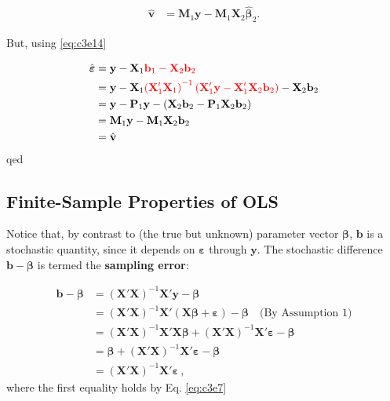 \documentclass[
]{book}
\begin{document}
\begin{align*}
\hat{\mathbf{v}} &= \mathbf{M}_1\mathbf{y}-\mathbf{M}_1\mathbf{X}_2\hat{\boldsymbol{\beta}}_2.
\end{align*}

But, using \eqref{eq:c3e14}

\begin{align*}
\hat{\boldsymbol{\varepsilon}}
&= \mathbf{y}-\mathbf{X}_1{\color{red}{\mathbf{b}_1}-\mathbf{X}_2\mathbf{b}_2} \\
&= \mathbf{y}-\mathbf{X}_1{\color{red}{\left(\mathbf{X}_1'\mathbf{X}_1\right)^{-1}\left(\mathbf{X}_1'\mathbf{y}-\mathbf{X}_1'\mathbf{X}_2\mathbf{b}_2\right)}} -\mathbf{X}_2\mathbf{b}_2\\
&= \mathbf{y}-\mathbf{P}_1\mathbf{y}-\left(\mathbf{X}_2\mathbf{b}_2-\mathbf{P}_1\mathbf{X}_2\mathbf{b}_2 \right)\\
&= \mathbf{M}_1\mathbf{y}-\mathbf{M}_1\mathbf{X}_2\mathbf{b}_2\\
&= \hat{\mathbf{v}}
\end{align*}
qed

\hfill\break

\hypertarget{finite-sample-properties-of-ols}{%
\subsection{Finite-Sample Properties of OLS}\label{finite-sample-properties-of-ols}}

Notice that, by contrast to (the true but unknown) parameter vector
\(\boldsymbol{\beta}\), \(\mathbf{b}\) is a stochastic quantity, since it depends on
\(\boldsymbol{\varepsilon}\) through \(\mathbf{y}\). The stochastic difference \(\mathbf{b}-\boldsymbol{\beta}\)
is termed the \textbf{sampling error}:

\begin{align*}
\mathbf{b}-\boldsymbol{\beta} &= (\mathbf{X}'\mathbf{X})^{-1}\mathbf{X}'\mathbf{y}-\boldsymbol{\beta}\\
 &= (\mathbf{X}'\mathbf{X})^{-1}\mathbf{X}'(\mathbf{X}\boldsymbol{\beta}+\boldsymbol{\varepsilon})-\boldsymbol{\beta}\quad\text{(By Assumption 1)}\\
 &= (\mathbf{X}'\mathbf{X})^{-1}\mathbf{X}'\mathbf{X}\boldsymbol{\beta}+(\mathbf{X}'\mathbf{X})^{-1}\mathbf{X}'\boldsymbol{\varepsilon}-\boldsymbol{\beta}\\
 &= \boldsymbol{\beta}+(\mathbf{X}'\mathbf{X})^{-1}\mathbf{X}'\boldsymbol{\varepsilon}-\boldsymbol{\beta}\\
 &= (\mathbf{X}'\mathbf{X})^{-1}\mathbf{X}'\boldsymbol{\varepsilon} \,,
\end{align*}
where the first equality holds by Eq. \eqref{eq:c3e7}
\end{document}
